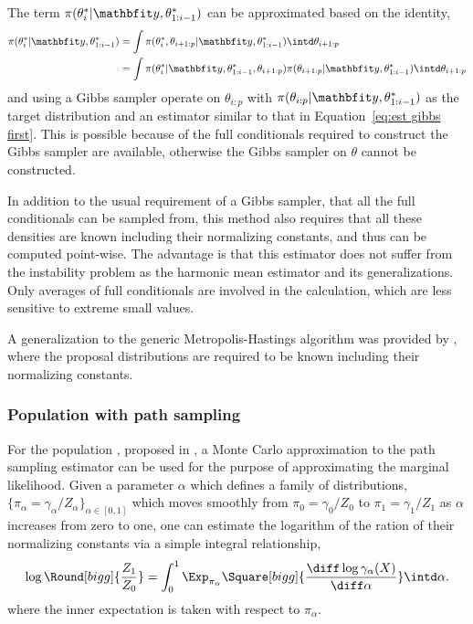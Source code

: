 The term $\pi(\theta_i^*|\data,\theta_{1:i-1}^*)$ can be approximated based on
the identity,
\begin{align}
  \pi(\theta_i^*|\data,\theta_{1:i-1}^*)
  &= \int \pi(\theta_i^*,\theta_{i+1:p}|\data,\theta_{1:i-1}^*)
  \intd\theta_{i+1:p} \notag\\
  &= \int \pi(\theta_i^*|\data,\theta_{1:i-1}^*,\theta_{i+1:p})
  \pi(\theta_{i+1:p}|\data,\theta_{1:i-1}^*) \intd\theta_{i+1:p}
\end{align}
and using a Gibbs sampler operate on $\theta_{i:p}$ with
$\pi(\theta_{i:p}|\data,\theta_{1:i-1}^*)$ as the target distribution and an
estimator similar to that in Equation~\eqref{eq:est gibbs first}. This is
possible because of the full conditionals required to construct the Gibbs
sampler are available, otherwise the Gibbs sampler on $\theta$ cannot be
constructed.

In addition to the usual requirement of a Gibbs sampler, that all the full
conditionals can be sampled from, this method also requires that all these
densities are known including their normalizing constants, and thus can be
computed point-wise. The advantage is that this estimator does not suffer from
the instability problem as the harmonic mean estimator and its
generalizations. Only averages of full conditionals are involved in the
calculation, which are less sensitive to extreme small values.

A generalization to the generic Metropolis-Hastings algorithm was provided by
\cite{Chib:2001gq}, where the proposal distributions are required to be
known including their normalizing constants.

\subsubsection{Population \mcmc with path sampling}
\label{ssub:Population mcmc with path sampling}

For the population \mcmc, proposed in \cite{Calderhead:2009bd}, a Monte Carlo
approximation to the path sampling estimator \cite{Gelman:1998ei} can be used
for the purpose of approximating the marginal likelihood. Given a parameter
$\alpha$ which defines a family of distributions, $\{\pi_{\alpha} =
\gamma_{\alpha}/Z_{\alpha}\}_{\alpha\in[0,1]}$ which moves smoothly from
$\pi_0 = \gamma_0/Z_0$ to $\pi_1 = \gamma_1/Z_1$ as $\alpha$ increases from
zero to one, one can estimate the logarithm of the ration of their normalizing
constants via a simple integral relationship,
\begin{equation}
  \log\Round[bigg]{\frac{Z_1}{Z_0}} = \int_0^1\Exp_{\pi_{\alpha}}
  \Square[bigg]{\frac{\diff\log\gamma_{\alpha}(X)}{\diff\alpha}}
  \intd\alpha.
  \label{eq:path integral}
\end{equation}
where the inner expectation is taken with respect to $\pi_{\alpha}$.

